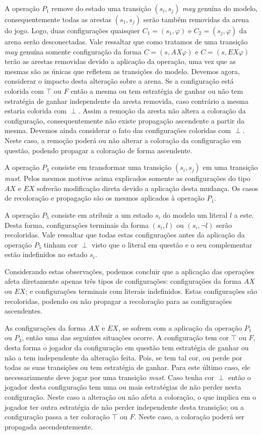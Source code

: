 \documentclass[normaltoc,capchap,capsec,times]{abnt}
\begin{document}
A operação $P_1$ remove do estado uma transição $(s_i,s_j)$ \textit{may} genuína do modelo, consequentemente todas as arestas $(s_1,s_j)$ serão também removidas da arena do jogo. Logo, duas configurações quaisquer $C_1 = (s_1,\varphi)$ e $C_2 = (s_j,\varphi)$ da arena serão desconectadas. Vale ressaltar que como tratamos de uma transição \textit{may} genuína somente configuração da forma $C = (s, AX \varphi)$ e $C = (s, EX \varphi)$ terão as arestas removidas devido a aplicação da operação, uma vez que as mesmas são as únicas que refletem as transições do modelo. Devemos agora, considerar o impacto desta alteração sobre a arena. %
Se a configuração está colorida com $\top$ ou $F$ então a mesma ou tem estratégia de ganhar ou não tem estratégia de ganhar independente da aresta removida, caso contrário a mesma estaria colorida com $\perp$. Assim a remoção da aresta não altera a coloração da configuração, consequentemente não existe propagação ascendente a partir da mesma. Devemos ainda considerar o fato das configurações coloridas com $\perp$. Neste caso, a remoção poderá ou não alterar a coloração da configuração em questão, podendo propagar a coloração de forma ascendente.

A operação $P_3$ consiste em transformar uma transição $(s_i,s_j)$ em uma transição \textit{must}. Pelos mesmos motivos acima explicados somente as configurações do tipo $AX$ e $EX$ sofrerão modificação direta devido a aplicação desta mudança. Os casos de recoloração e propagação são os mesmos aplicados à operação $P_1$.

A operação $P_5$ consiste em atribuir a um estado $s_i$ do modelo um literal $l$ a este. Desta forma, configurações terminais da forma $(s_i, l)$ ou $(s_i, \neg l)$ serão recoloridas. Vale ressaltar que todas estas configurações antes da aplicação da operação $P_5$ tinham cor $\perp$ visto que o literal em questão e o seu complementar estão indefinidos no estado $s_i$.

Considerando estas observações, podemos concluir que a aplicação das operações afeta diretamente apenas três tipos de configurações: configurações da forma $AX$ ou $EX$; e configurações terminais com literais indefinidos. Estas configurações são recoloridas, podendo ou não propagar a recoloração para as configurações ascendentes.

As configurações da forma $AX$ e $EX$, se sofrem com a aplicação da operação $P_1$ ou $P_3$, então uma das seguintes situações ocorre. A configuração tem cor $\top$ ou $F$, desta forma o jogador da configuração em questão tem estratégia de ganhar ou não a tem independente da alteração feita. Pois, se tem tal cor, ou perde por todas as suas transições ou tem estratégia de ganhar. Para este último caso, ele necessariamente deve jogar por uma transição \textit{must}. Caso tenha cor $\perp$ então o jogador desta configuração tem uma ou mais estratégias de não perder nesta configuração. Neste caso a alteração ou não afeta a coloração, o que implica em o jogador ter outra estratégia de não perder independente desta transição; ou a configuração passa a ter coloração $\top$ ou $F$. Neste caso, a coloração poderá ser propagada ascendentemente. 
\end{document}
